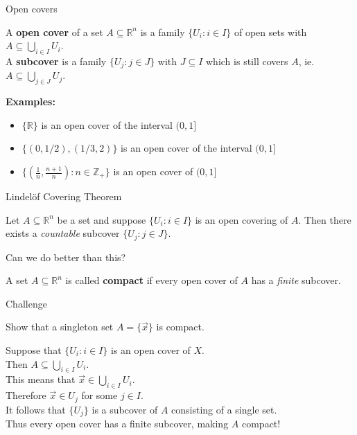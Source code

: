 \documentclass{beamer}
\begin{document}
\begin{frame}{Open covers}
\begin{defn}
A \textbf{open cover} of a set $A\subseteq\mathbb{R}^n$ is a family $\{U_i: i\in I\}$ of open sets with $A\subseteq \bigcup_{i\in I} U_i$.\\\pause
A \textbf{subcover} is a family $\{U_j: j\in J\}$ with $J\subseteq I$ which is still covers $A$, ie. $A\subseteq \bigcup_{j\in J} U_j$.
\end{defn}
\pause
\textbf{Examples:}
\begin{itemize}
\pause
\item $\{\mathbb{R}\}$ is an open cover of the interval $(0,1]$
\pause
\item $\{(0,1/2), (1/3, 2)\}$ is an open cover of the interval $(0,1]$
\pause
\item $\{(\frac{1}{n},\frac{n+1}{n}): n\in\mathbb{Z}_+\}$ is an open cover of $(0,1]$
\end{itemize}
\end{frame}

\begin{frame}{Lindel\"{o}f Covering Theorem}
\begin{thm}
Let $A\subseteq\mathbb{R}^n$ be a set and suppose $\{U_i: i\in I\}$ is an open covering of $A$.
Then there exists a \emph{countable} subcover $\{U_j: j\in J\}.$
\end{thm}
\pause
\begin{quest}
Can we do better than this?
\end{quest}
\pause
\begin{defn}
A set $A\subseteq\mathbb{R}^n$ is called \textbf{compact} if every open cover of $A$ has a \emph{finite} subcover.
\end{defn}
\end{frame}

\begin{frame}{Challenge}
\begin{prob}
Show that a singleton set $A=\{\vec x\}$ is compact.
\end{prob}
\pause
\begin{soln}
\pause
Suppose that $\{U_i: i\in I\}$ is an open cover of $X$.\\
\pause
Then $A\subseteq \bigcup_{i\in I} U_i$.\\
\pause
This means that $\vec x\in\bigcup_{i\in I} U_i$.\\
\pause
Therefore $\vec x\in U_j$ for some $j\in I$.\\
\pause
It follows that $\{U_j\}$ is a subcover of $A$ consisting of a single set.\\
\pause
Thus every open cover has a finite subcover, making $A$ compact!
\end{soln}
\end{frame}
\end{document}
